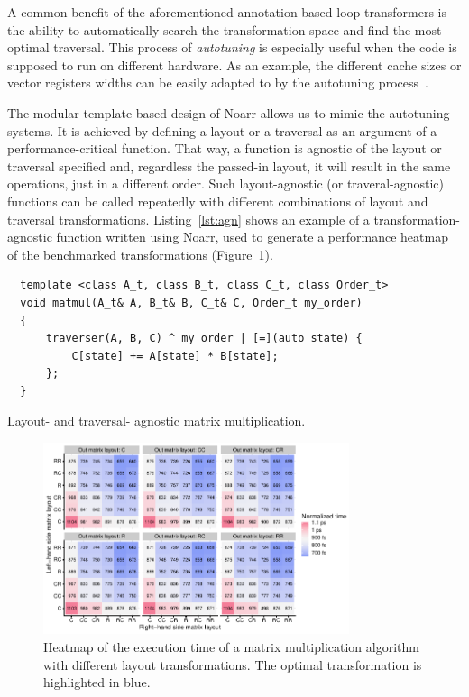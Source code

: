 A common benefit of the aforementioned annotation-based loop transformers is the ability to automatically search the transformation space and find the most optimal traversal. This process of \emph{autotuning} is especially useful when the code is supposed to run on different hardware. As an example, the different cache sizes or vector registers widths can be easily adapted to by the autotuning process~\cite{frigo1998fftw,puschel2004spiral,whaley1998automatically}. 

The modular template-based design of Noarr allows us to mimic the autotuning systems. It is achieved by defining a layout or a traversal as an argument of a performance-critical function. That way, a function is agnostic of the layout or traversal specified and, regardless the passed-in layout, it will result in the same operations, just in a different order. Such layout-agnostic (or traveral-agnostic) functions can be called repeatedly with different combinations of layout and traversal transformations. Listing~\ref{lst:agn} shows an example of a transformation-agnostic function written using Noarr, used to generate a performance heatmap of the benchmarked transformations (Figure~\ref{fig:heatmap_all}).

\begin{listing}
  \begin{verbatim}
  template <class A_t, class B_t, class C_t, class Order_t>
  void matmul(A_t& A, B_t& B, C_t& C, Order_t my_order) 
  {
      traverser(A, B, C) ^ my_order | [=](auto state) {
          C[state] += A[state] * B[state];
      };
  }
  \end{verbatim}
  \caption{Layout- and traversal- agnostic matrix multiplication.}
  \label{lst:agn}
\end{listing}

\begin{figure}
  \centering
  \includegraphics[width=0.8\textwidth]{img/heatmap_all}
  \caption{Heatmap of the execution time of a matrix multiplication algorithm with different layout transformations. The optimal transformation is highlighted in blue.}
  \label{fig:heatmap_all}
\end{figure}

